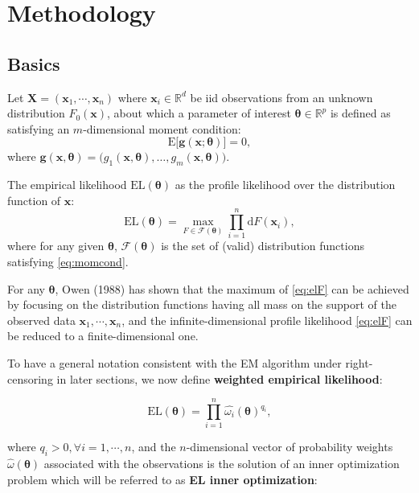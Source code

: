 \documentclass[article]{jss}
\renewcommand{\|}{\,|\,}
\begin{document}
\hypertarget{methodology}{%
\section{Methodology}\label{methodology}}

\hypertarget{basics}{%
\subsection{Basics}\label{basics}}

Let \(\bm X= (\bm x_1,\cdots,\bm x_n)\) where \(\bm x_i\in\mathbb R^d\) be iid observations from an unknown distribution \(F_0(\bm x)\), about which a parameter of interest \(\bm \theta\in \mathbb R^p\) is defined as satisfying an \(m\)-dimensional moment condition:
\begin{equation} \label{eq:momcond}
  \textrm{E}\bigl[\bm g(\bm x;\bm \theta)\bigr] = 0,
\end{equation}
where \(\bm g(\bm x, \bm \theta) = \bigl( g_1(\bm x, \bm \theta), \ldots, g_m(\bm x, \bm \theta) \bigr)\).

The empirical likelihood \(\textrm{EL}(\bm \theta)\) as the profile likelihood over the distribution function of \(\bm x\):
\begin{equation} \label{eq:elF}
  \textrm{EL}(\bm \theta) = \max_{F \in \mathcal F(\bm \theta)} \prod_{i=1}^n \mathrm{d} F(\bm x_i),
\end{equation}
where for any given \(\bm \theta\), \(\mathcal F(\bm \theta)\) is the set of (valid) distribution functions satisfying \eqref{eq:momcond}.

For any \(\bm \theta\), Owen (1988) has shown that the maximum of \eqref{eq:elF} can be achieved by focusing on the distribution functions having all mass on the support of the observed data \(\bm x_1, \cdots, \bm x_n\), and the infinite-dimensional profile likelihood \eqref{eq:elF} can be reduced to a finite-dimensional one.

To have a general notation consistent with the EM algorithm under right-censoring in later sections, we now define \textbf{weighted empirical likelihood}:

\begin{equation}
  \textrm{EL}(\bm \theta) = \prod_{i=1}^n \hat{\omega_i}(\bm \theta)^{q_i},
\end{equation}

where \(q_i > 0, \forall i=1,\cdots,n\), and the \(n\)-dimensional vector of probability weights \(\hat{\omega}(\bm \theta)\) associated with the observations is the solution of an inner optimization problem which will be referred to as \textbf{EL inner optimization}:
\end{document}
